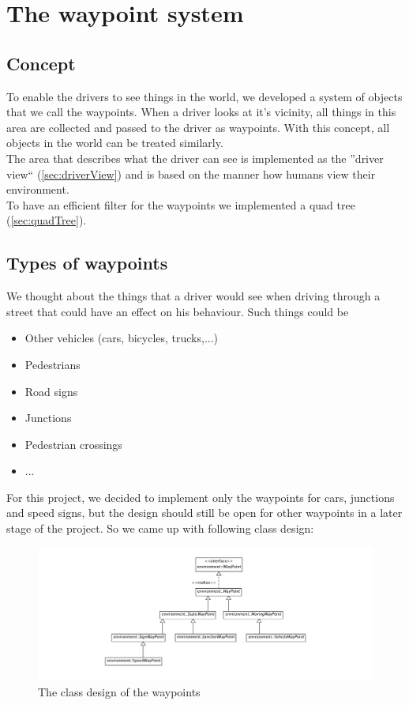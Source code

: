\section{The waypoint system}
\label{sec:wayPointSystem}

\subsection{Concept}

To enable the drivers to see things in the world, we developed a system of 
objects that we call the waypoints. When a driver looks at it's vicinity, all
things in this area are collected and passed to the driver as waypoints. With
this concept, all objects in the world can be treated similarly.\\

\noindent The area that describes what the driver can see is implemented as the 
''driver view`` (\ref{sec:driverView}) and is based on the manner 
how humans view their environment. \\

\noindent To have an efficient filter for the waypoints we implemented a quad tree 
(\ref{sec:quadTree}).

\subsection{Types of waypoints}

We thought about the things that a driver would see when driving through a 
street that could have an effect on his behaviour. Such things could be

\begin{itemize}
\item Other vehicles (cars, bicycles, trucks,...)
\item Pedestrians
\item Road signs
\item Junctions
\item Pedestrian crossings
\item ...
\end{itemize}

For this project, we decided to implement only the waypoints for 
cars, junctions and speed signs, but the design should still be open for 
other waypoints in a later stage of the project. So we came up with following
class design:

\begin{figure}[htb]
\includegraphics[width=\textwidth]{images/waypoints.png}
\caption{The class design of the waypoints}
\label{fig:waypoints}
\end{figure}

